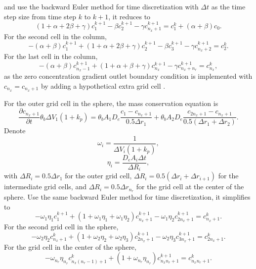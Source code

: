 \documentclass{article}
\begin{document}
and use the backward Euler method for time discretization with $\Delta t$ as the time step size from time step $k$ to $k+1$, it reduces to
\begin{equation}
(1 + \alpha + 2 \beta + \gamma) c_1^{k+1}  - \beta c_2^{k+1} - \gamma c_{n_x+1}^{k+1} = c_1^k + (\alpha + \beta) c_0.
\end{equation}
For the second cell in the column, 
\begin{equation}
-(\alpha + \beta)c_1^{k+1}  + (1 +  \alpha + 2 \beta + \gamma ) c_2^{k+1}  - \beta c_3^{k+1}- \gamma c_{n_x+2}^{k+1} =  c_2^k .
\end{equation}
For the last cell in the column,
\begin{equation}
-(\alpha + \beta)c_{n_x-1}^{k+1}  + (1 +  \alpha + \beta + \gamma ) c_{n_x}^{k+1}  - \gamma c_{n_x+n_r}^{k+1} =  c_{n_x}^k,
\end{equation}
as the zero concentration gradient outlet boundary condition is implemented with $c_{n_x} = c_{n_x+1}$ by adding a hypothetical extra grid cell \cite{Zheng2002}.

For the outer grid cell in the sphere, the mass conservation equation is
\begin{equation}
\frac{\partial c_{n_x+1}}{\partial t}\theta_b\Delta V_1 (1 + k_p) =  \theta_b A_1D_e \frac{c_1 - c_{n_x+1}}{0.5\Delta r_1} +  \theta_b A_2D_e \frac{c_{2n_x+1} - c_{n_x+1}}{0.5(\Delta r_1 + \Delta r_2)}.
\end{equation}
Denote 
\begin{equation}
\omega_i = \frac{1}{\Delta V_i (1+k_p)},
\end{equation}
\begin{equation}
\eta_i = \frac{D_eA_i\Delta t}{\Delta R_i}, 
\end{equation}
with $\Delta R_i = 0.5\Delta r_1$ for the outer grid cell, $\Delta R_i = 0.5 (\Delta r_i + \Delta r_{i+1})$ for the intermediate grid cells, and $\Delta R_i = 0.5 \Delta r_{n_r}$ for the grid cell at the center of the sphere. 
Use the same backward Euler method for time discretization, it simplifies to
\begin{equation}
-\omega_1 \eta_1 c_1^{k+1}  + (1 + \omega_1\eta_1 + \omega_1\eta_2) c_{n_x+1}^{k+1} -  \omega_1 \eta_2 c_{2n_x+1}^{k+1} =   c_{n_x+1}^{k}.
\end{equation}
For the second grid cell in the sphere,
\begin{equation}
-\omega_2 \eta_2 c_{n_x+1}^{k} + (1 + \omega_2 \eta_2 + \omega_2 \eta_3)  c_{2n_x+1}^{k+1} -  \omega_2 \eta_3 c_{3n_x+1}^{k+1}=  c_{2n_x+1}^{k}.
\end{equation}
For the grid cell in the center of the sphere,
\begin{equation}
-\omega_{n_r} \eta_{n_r} c_{n_x(n_r-1)+1}^{k} +  (1 + \omega_{n_r} \eta_{n_r}) c_{n_xn_r+1}^{k+1} =  c_{n_xn_r+1}^{k}.
\end{equation}
\end{document}
